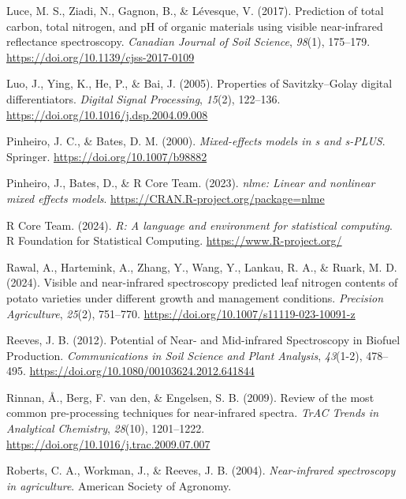 \documentclass[
]{agujournal2019}
\newlength{\cslhangindent}
\newenvironment{CSLReferences}[2] %
 {\begin{list}{}{%
  \setlength{\itemindent}{0pt}
  \setlength{\leftmargin}{0pt}
  \setlength{\parsep}{0pt}
  \ifodd #1
   \setlength{\leftmargin}{\cslhangindent}
   \setlength{\itemindent}{-1\cslhangindent}
  \fi
  \setlength{\itemsep}{#2\baselineskip}}}
 {\end{list}}
\begin{document}
\begin{CSLReferences}{1}{0}
Luce, M. S., Ziadi, N., Gagnon, B., \& Lévesque, V. (2017). Prediction
of total carbon, total nitrogen, and {pH} of organic materials using
visible near-infrared reflectance spectroscopy. \emph{Canadian Journal
of Soil Science}, \emph{98}(1), 175--179.
\url{https://doi.org/10.1139/cjss-2017-0109}

Luo, J., Ying, K., He, P., \& Bai, J. (2005). Properties of
{Savitzky}--{Golay} digital differentiators. \emph{Digital Signal
Processing}, \emph{15}(2), 122--136.
\url{https://doi.org/10.1016/j.dsp.2004.09.008}

Pinheiro, J. C., \& Bates, D. M. (2000). \emph{Mixed-effects models in s
and s-PLUS}. Springer. \url{https://doi.org/10.1007/b98882}

Pinheiro, J., Bates, D., \& R Core Team. (2023). \emph{{nlme}: Linear
and nonlinear mixed effects models}.
\url{https://CRAN.R-project.org/package=nlme}

R Core Team. (2024). \emph{{R}: A language and environment for
statistical computing}. R Foundation for Statistical Computing.
\url{https://www.R-project.org/}

Rawal, A., Hartemink, A., Zhang, Y., Wang, Y., Lankau, R. A., \& Ruark,
M. D. (2024). Visible and near-infrared spectroscopy predicted leaf
nitrogen contents of potato varieties under different growth and
management conditions. \emph{Precision Agriculture}, \emph{25}(2),
751--770. \url{https://doi.org/10.1007/s11119-023-10091-z}

Reeves, J. B. (2012). Potential of {Near}- and {Mid}-infrared
{Spectroscopy} in {Biofuel} {Production}. \emph{Communications in Soil
Science and Plant Analysis}, \emph{43}(1-2), 478--495.
\url{https://doi.org/10.1080/00103624.2012.641844}

Rinnan, Å., Berg, F. van den, \& Engelsen, S. B. (2009). Review of the
most common pre-processing techniques for near-infrared spectra.
\emph{TrAC Trends in Analytical Chemistry}, \emph{28}(10), 1201--1222.
\url{https://doi.org/10.1016/j.trac.2009.07.007}

Roberts, C. A., Workman, J., \& Reeves, J. B. (2004).
\emph{Near-infrared spectroscopy in agriculture}. American Society of
Agronomy.


\end{CSLReferences}
\end{document}
